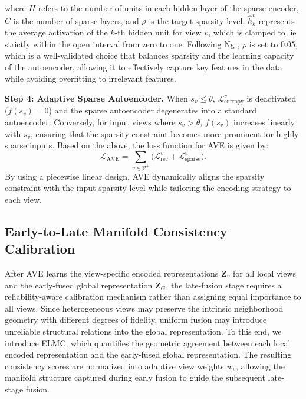 \documentclass[10pt, journal, compsoc]{IEEEtran}
\begin{document}
where $H$ refers to the number of units in each hidden layer of the sparse encoder, $C$ is the number of sparse layers, and $\rho$ is the target sparsity level. $\hat{h}^{v}_{k}$ represents the average activation of the $k$-th hidden unit for view $v$, which is clamped to lie strictly within the open interval from zero to one. Following Ng \citep{ng2011sparse}, $\rho$ is set to 0.05, which is a well-validated choice that balances sparsity and the learning capacity of the autoencoder, allowing it to effectively capture key features in the data while avoiding overfitting to irrelevant features.

\textbf{Step 4: Adaptive Sparse Autoencoder.} When $s_{v}\leq \theta$, $\mathcal{L}_{\text{entropy}}^{v}$ is deactivated ($f (s_{v}) = 0$) and the sparse autoencoder degenerates into a standard autoencoder. Conversely, for input views where $s_{v}> \theta$, $f(s_{v})$ increases linearly with $s_{v}$, ensuring that the sparsity constraint becomes more prominent for highly sparse inputs. Based on the above, the loss function for AVE is given by:
\begin{equation}
\mathcal{L}_{\mathrm{AVE}}
=
\sum_{v\in\mathcal{V}^{+}}
\bigl(
\mathcal{L}_{\mathrm{rec}}^{v}
+
\mathcal{L}_{\mathrm{sparse}}^{v}
\bigr).
\label{eq:ave_loss}
\end{equation}
By using a piecewise linear design, AVE dynamically aligns the sparsity constraint with the input sparsity level while tailoring the encoding strategy to each view.

\subsection{Early-to-Late Manifold Consistency Calibration}
\label{sec:elmc}
After AVE learns the view-specific encoded representations $\mathbf{Z}_{v}$ for all local views and the early-fused global representation $\mathbf{Z}_{G}$, the late-fusion stage requires a reliability-aware calibration mechanism rather than assigning equal importance to all views. Since heterogeneous views may preserve the intrinsic neighborhood geometry with different degrees of fidelity, uniform fusion may introduce unreliable structural relations into the global representation. To this end, we introduce ELMC, which quantifies the geometric agreement between each local encoded representation and the early-fused global representation. The resulting consistency scores are normalized into adaptive view weights $w_v$, allowing the manifold structure captured during early fusion to guide the subsequent late-stage fusion.
\end{document}
